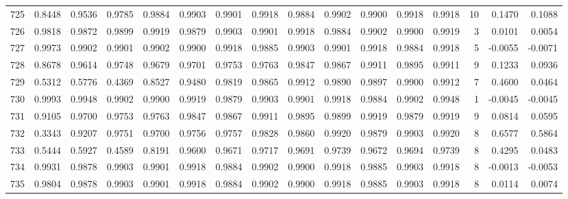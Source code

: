 \begin{tabular}{lrrrrrrrrrrrrrrr}
725 &      0.8448 &  0.9536 &  0.9785 &  0.9884 &  0.9903 &  0.9901 &  0.9918 &  0.9884 &  0.9902 &  0.9900 &   0.9918 &     0.9918 &     10 &                    0.1470 &                     0.1088 \\
726 &      0.9818 &  0.9872 &  0.9899 &  0.9919 &  0.9879 &  0.9903 &  0.9901 &  0.9918 &  0.9884 &  0.9902 &   0.9900 &     0.9919 &      3 &                    0.0101 &                     0.0054 \\
727 &      0.9973 &  0.9902 &  0.9901 &  0.9902 &  0.9900 &  0.9918 &  0.9885 &  0.9903 &  0.9901 &  0.9918 &   0.9884 &     0.9918 &      5 &                   -0.0055 &                    -0.0071 \\
728 &      0.8678 &  0.9614 &  0.9748 &  0.9679 &  0.9701 &  0.9753 &  0.9763 &  0.9847 &  0.9867 &  0.9911 &   0.9895 &     0.9911 &      9 &                    0.1233 &                     0.0936 \\
729 &      0.5312 &  0.5776 &  0.4369 &  0.8527 &  0.9480 &  0.9819 &  0.9865 &  0.9912 &  0.9890 &  0.9897 &   0.9900 &     0.9912 &      7 &                    0.4600 &                     0.0464 \\
730 &      0.9993 &  0.9948 &  0.9902 &  0.9900 &  0.9919 &  0.9879 &  0.9903 &  0.9901 &  0.9918 &  0.9884 &   0.9902 &     0.9948 &      1 &                   -0.0045 &                    -0.0045 \\
731 &      0.9105 &  0.9700 &  0.9753 &  0.9763 &  0.9847 &  0.9867 &  0.9911 &  0.9895 &  0.9899 &  0.9919 &   0.9879 &     0.9919 &      9 &                    0.0814 &                     0.0595 \\
732 &      0.3343 &  0.9207 &  0.9751 &  0.9700 &  0.9756 &  0.9757 &  0.9828 &  0.9860 &  0.9920 &  0.9879 &   0.9903 &     0.9920 &      8 &                    0.6577 &                     0.5864 \\
733 &      0.5444 &  0.5927 &  0.4589 &  0.8191 &  0.9600 &  0.9671 &  0.9717 &  0.9691 &  0.9739 &  0.9672 &   0.9694 &     0.9739 &      8 &                    0.4295 &                     0.0483 \\
734 &      0.9931 &  0.9878 &  0.9903 &  0.9901 &  0.9918 &  0.9884 &  0.9902 &  0.9900 &  0.9918 &  0.9885 &   0.9903 &     0.9918 &      8 &                   -0.0013 &                    -0.0053 \\
735 &      0.9804 &  0.9878 &  0.9903 &  0.9901 &  0.9918 &  0.9884 &  0.9902 &  0.9900 &  0.9918 &  0.9885 &   0.9903 &     0.9918 &      8 &                    0.0114 &                     0.0074 \\

\end{tabular}
